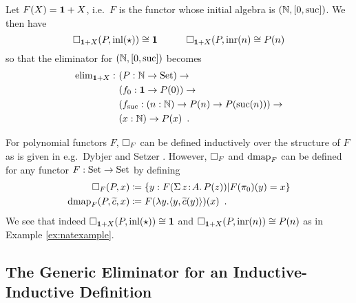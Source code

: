 \documentclass[orivec,envcountsame, ,envcountsect]{llncs}
\begin{document}
\begin{example}
\label{ex:natexample}
  Let $F(X) = \mathbf{1} + X$, i.e.\ $F$ is the functor whose initial
  algebra is $(\mathbb{N}, [0, \text{suc}])$.  We then have
\[ %
  \BOX_{\one + X}(P, \inl(\oneelt)) \cong \one \qquad\quad
  \BOX_{\one + X}(P, \inr(n) \cong P(n)
\] %
so that the eliminator for $(\mathbb{N}, [0, \text{suc}])$ becomes
\begin{align*}
\text{elim}_{\mathbf{1} + X} :\ & (P : \mathbb{N} \to \text{Set}) \to \\
         & (f_0 : \mathbf{1} \to P(0)) \to \\
         & (f_{\text{suc}} : (n : \mathbb{N}) \to P(n) \to P(\text{suc}(n))) \to \\
         & (x : \mathbb{N}) \to P(x) \enspace .
\end{align*}

\end{example}

For polynomial functors $F$, $\Box_F$ can be defined inductively over
the structure of $F$ as is given in e.g.\ Dybjer and Setzer
\cite{dybjersetzer2003inalg}. However, $\Box_F$ and $\text{dmap}_F$ can be
defined for any functor $F : \text{Set} \to \text{Set}$ by defining
\begin{align*}
  \Box_F(P, x) &\coloneqq \{ y : F(\Sigma\,z\!:\!A .\,P(z)) | F(\pi_0)(y) = x\} \\
  \text{dmap}_F(P, \widetilde{c}, x) &\coloneqq F(\lambda y . \langle y, \widetilde{c}(y)\rangle)(x) \enspace .
\end{align*}
We see that indeed $\Box_{\mathbf{1} + X}(P, \text{inl}(\star)) \cong \mathbf{1}$ and
$\Box_{\mathbf{1} + X}(P, \text{inr}(n)) \cong P(n)$ as in Example \ref{ex:natexample}.


\subsection{The Generic Eliminator for an Inductive-Inductive Definition}
\label{sec:elim-indind}
\end{document}
